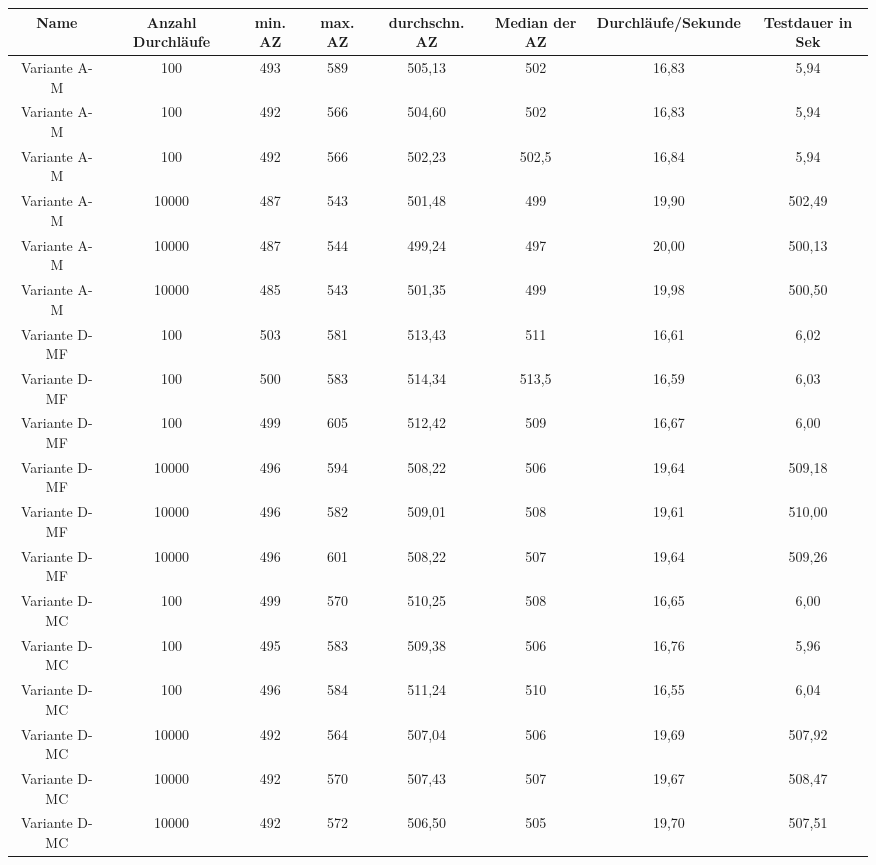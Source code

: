 \begin{landscape}
	\begin{table}[h!]
		\centering
		\small
		\begin{tabular}{ |c|c|c|c|c|c|c|c|} 
			\hline
			Name & Anzahl Durchläufe & min. AZ & max. AZ & durchschn. AZ & Median der AZ & Durchläufe/Sekunde & Testdauer in Sek\\ 
			\hline
			Variante A-M & 100 & 493 & 589 & 505,13 & 502 & 16,83 & 5,94 \\ 
			\hline
			Variante A-M & 100 & 492 & 566 & 504,60 & 502 & 16,83 & 5,94 \\ 
			\hline
			Variante A-M & 100 & 492 & 566 & 502,23 & 502,5 & 16,84 & 5,94 \\ 
			\hline
			
			Variante A-M & 10000 & 487 & 543 & 501,48 & 499 & 19,90 & 502,49 \\ 
			\hline
			Variante A-M & 10000 & 487 & 544 & 499,24 & 497 & 20,00 & 500,13 \\ 
			\hline
			Variante A-M & 10000 & 485 & 543 & 501,35 & 499 & 19,98 & 500,50 \\ 
			\hline
			
			Variante D-MF & 100 & 503 & 581 & 513,43 & 511 & 16,61 & 6,02 \\ 
			\hline
			Variante D-MF & 100 & 500 & 583 & 514,34 & 513,5 & 16,59 & 6,03 \\ 
			\hline
			Variante D-MF & 100 & 499 & 605 & 512,42 & 509 & 16,67 & 6,00 \\ 
			\hline
			
			Variante D-MF & 10000 & 496 & 594 & 508,22 & 506 & 19,64 & 509,18 \\ 
			\hline
			Variante D-MF & 10000 & 496 & 582 & 509,01 & 508 & 19,61 & 510,00 \\ 
			\hline
			Variante D-MF & 10000 & 496 & 601 & 508,22 & 507 & 19,64 & 509,26 \\ 
			\hline
			
			Variante D-MC & 100 & 499 & 570 & 510,25 & 508 & 16,65 & 6,00 \\ 
			\hline
			Variante D-MC & 100 & 495 & 583 & 509,38 & 506 & 16,76 & 5,96 \\ 
			\hline
			Variante D-MC & 100 & 496 & 584 & 511,24 & 510 & 16,55 & 6,04 \\ 
			\hline
			
			Variante D-MC & 10000 & 492 & 564 & 507,04 & 506 & 19,69 & 507,92 \\ 
			\hline
			Variante D-MC & 10000 & 492 & 570 & 507,43 & 507 & 19,67 & 508,47 \\ 
			\hline
			Variante D-MC & 10000 & 492 & 572 & 506,50 & 505 & 19,70 & 507,51 \\ 
			\hline
			

\end{tabular}
\end{table}
\end{landscape}
